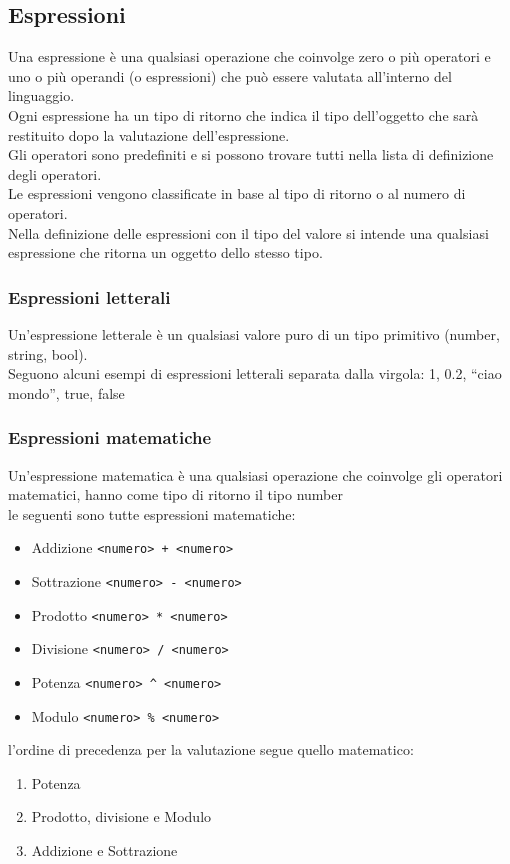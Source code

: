 \subsection{Espressioni}
Una espressione è una qualsiasi operazione che coinvolge zero o più operatori e uno o più operandi 
(o espressioni) che può essere valutata all’interno del linguaggio. \\
Ogni espressione ha un tipo di ritorno che indica il tipo dell’oggetto che sarà restituito dopo la valutazione 
dell’espressione. \\
Gli operatori sono predefiniti e si possono trovare tutti nella lista di definizione degli operatori. \\
Le espressioni vengono classificate in base al tipo di ritorno o al numero di operatori.
\\
Nella definizione delle espressioni con il tipo del valore si intende una qualsiasi espressione che ritorna 
un oggetto dello stesso tipo.

\subsubsection{Espressioni letterali}
Un’espressione letterale è un qualsiasi valore puro di un tipo primitivo (number, string, bool). \\
Seguono alcuni esempi di espressioni letterali separata dalla virgola: 1, 0.2, “ciao mondo”, true, false

\subsubsection{Espressioni matematiche}
Un'espressione matematica è una qualsiasi operazione che coinvolge gli operatori matematici,
hanno come tipo di ritorno il tipo number
\\
le seguenti sono tutte espressioni matematiche:
\begin{itemize}
    \item Addizione \lstinline|<numero> + <numero>|
    \item Sottrazione \lstinline|<numero> - <numero>|
    \item Prodotto \lstinline|<numero> * <numero>|
    \item Divisione \lstinline|<numero> / <numero>|
    \item Potenza \lstinline|<numero> ^ <numero>|
    \item Modulo \lstinline|<numero> % <numero>|
\end{itemize}
l'ordine di precedenza per la valutazione segue quello matematico:
\begin{enumerate}
    \item Potenza
    \item Prodotto, divisione e Modulo
    \item Addizione e Sottrazione
\end{enumerate}

